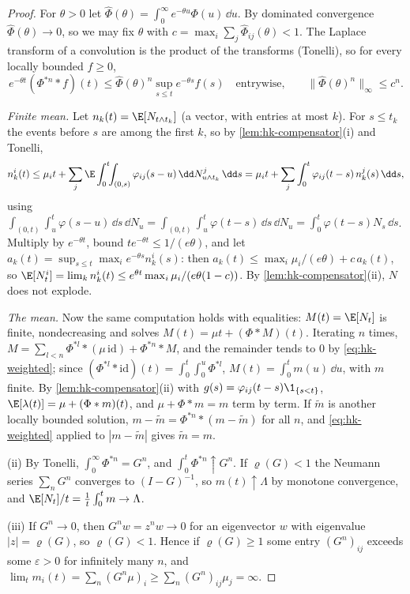 \begin{proof}
For $\theta>0$ let $\hat\Phi(\theta)=\int_0^\infty e^{-\theta u}\Phi(u)\,\dd u$. By dominated convergence
$\hat\Phi(\theta)\to0$, so we may fix $\theta$ with $c=\max_i\sum_j\hat\Phi_{ij}(\theta)<1$. The Laplace transform
of a convolution is the product of the transforms (Tonelli), so for every locally bounded $f\ge0$,
\begin{equation}\label{eq:hk-weighted}
  e^{-\theta t}(\Phi^{*n}*f)(t)\le\hat\Phi(\theta)^n\sup_{s\le t}e^{-\theta s}f(s)\quad\text{entrywise,}\qquad
  \|\hat\Phi(\theta)^n\|_\infty\le c^n .
\end{equation}

\emph{Finite mean.} Let $n_k(t)=\E[N_{t\wedge t_k}]$ (a vector, with entries at most $k$). For $s\le t_k$ the
events before $s$ are among the first $k$, so by \cref{lem:hk-compensator}(i) and Tonelli,
\[
  n^i_k(t)\le\mu_it+\sum_j\E\int_0^t\!\!\int_{(0,s)}\varphi_{ij}(s-u)\,\dd N^j_{u\wedge t_k}\,\dd s
  =\mu_it+\sum_j\int_0^t\varphi_{ij}(t-s)\,n^j_k(s)\,\dd s ,
\]
using $\int_{(0,t)}\int_u^t\varphi(s-u)\,\dd s\,\dd N_u=\int_{(0,t)}\int_u^t\varphi(t-s)\,\dd s\,\dd N_u=\int_0^t\varphi(t-s)N_s\,\dd s$.
Multiply by $e^{-\theta t}$, bound $te^{-\theta t}\le1/(e\theta)$, and let $a_k(t)=\sup_{s\le t}\max_ie^{-\theta s}n^i_k(s)$:
then $a_k(t)\le\max_i\mu_i/(e\theta)+c\,a_k(t)$, so $\E[N^i_t]=\lim_kn^i_k(t)\le e^{\theta t}\max_i\mu_i/(e\theta(1-c))$.
By \cref{lem:hk-compensator}(ii), $N$ does not explode.

\emph{The mean.} Now the same computation holds with equalities: $M(t)=\E[N_t]$ is finite, nondecreasing and
solves $M(t)=\mu t+(\Phi*M)(t)$. Iterating $n$ times, $M=\sum_{l<n}\Phi^{*l}*(\mu\,\mathrm{id})+\Phi^{*n}*M$, and
the remainder tends to $0$ by \eqref{eq:hk-weighted}; since $(\Phi^{*l}*\mathrm{id})(t)=\int_0^t\int_0^u\Phi^{*l}$,
$M(t)=\int_0^tm(u)\,\dd u$, with $m$ finite. By \cref{lem:hk-compensator}(ii) with
$g(s)=\varphi_{ij}(t-s)\1_{\{s<t\}}$, $\E[\lambda(t)]=\mu+(\Phi*m)(t)$, and $\mu+\Phi*m=m$ term by term. If $\tilde m$ is
another locally bounded solution, $m-\tilde m=\Phi^{*n}*(m-\tilde m)$ for all $n$, and \eqref{eq:hk-weighted}
applied to $|m-\tilde m|$ gives $\tilde m=m$.

(ii) By Tonelli, $\int_0^\infty\Phi^{*n}=G^n$, and $\int_0^t\Phi^{*n}\uparrow G^n$. If $\varrho(G)<1$ the
Neumann series $\sum_nG^n$ converges to $(I-G)^{-1}$, so $m(t)\uparrow\Lambda$ by monotone convergence, and
$\E[N_t]/t=\frac1t\int_0^tm\to\Lambda$.

(iii) If $G^n\to0$, then $G^nw=z^nw\to0$ for an eigenvector $w$ with eigenvalue $|z|=\varrho(G)$, so $\varrho(G)<1$.
Hence if $\varrho(G)\ge1$ some entry $(G^n)_{ij}$ exceeds some $\varepsilon>0$ for infinitely many $n$, and
$\lim_tm_i(t)=\sum_n(G^n\mu)_i\ge\sum_n(G^n)_{ij}\mu_j=\infty$.
\end{proof}

